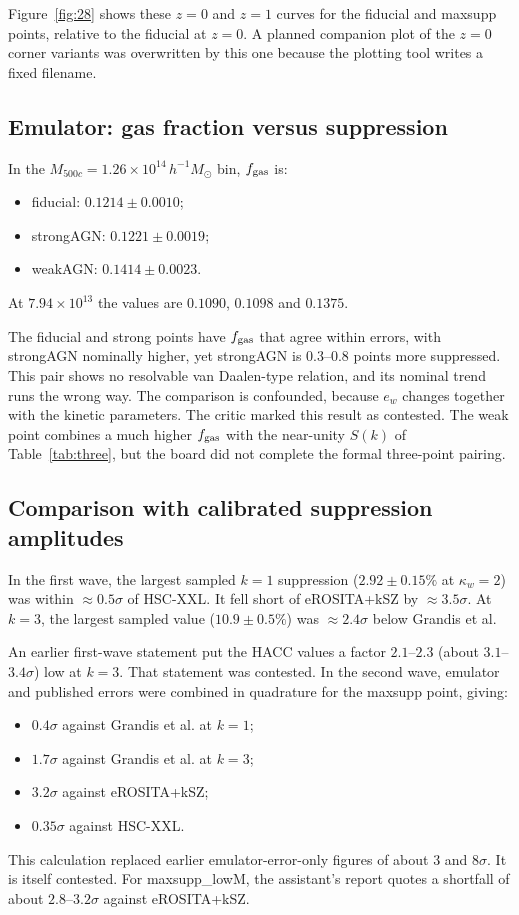 \documentclass[11pt,a4paper]{article}
\begin{document}
Figure~\ref{fig:28} shows these $z=0$ and $z=1$ curves for the fiducial and maxsupp points, relative to the fiducial at $z=0$. A planned companion plot of the $z=0$ corner variants was overwritten by this one because the plotting tool writes a fixed filename.






\subsection{Emulator: gas fraction versus suppression}
In the $M_{500c}=1.26\times10^{14}\,h^{-1}M_\odot$ bin, $f_{\rm gas}$ is:
\begin{itemize}
\item fiducial: $0.1214\pm0.0010$;
\item strongAGN: $0.1221\pm0.0019$;
\item weakAGN: $0.1414\pm0.0023$.
\end{itemize}
At $7.94\times10^{13}$ the values are $0.1090$, $0.1098$ and $0.1375$.

The fiducial and strong points have $f_{\rm gas}$ that agree within errors, with strongAGN nominally higher, yet strongAGN is 0.3--0.8 points more suppressed. This pair shows no resolvable van Daalen-type relation, and its nominal trend runs the wrong way. The comparison is confounded, because $e_w$ changes together with the kinetic parameters. The critic marked this result as contested. The weak point combines a much higher $f_{\rm gas}$ with the near-unity $S(k)$ of Table~\ref{tab:three}, but the board did not complete the formal three-point pairing.

\subsection{Comparison with calibrated suppression amplitudes}
In the first wave, the largest sampled $k=1$ suppression ($2.92\pm0.15\%$ at $\kappa_w=2$) was within $\approx0.5\sigma$ of HSC-XXL. It fell short of eROSITA+kSZ by $\approx3.5\sigma$. At $k=3$, the largest sampled value ($10.9\pm0.5\%$) was $\approx2.4\sigma$ below Grandis et al.

An earlier first-wave statement put the HACC values a factor $2.1$--$2.3$ (about $3.1$--$3.4\sigma$) low at $k=3$. That statement was contested. In the second wave, emulator and published errors were combined in quadrature for the maxsupp point, giving:
\begin{itemize}
\item $0.4\sigma$ against Grandis et al. at $k=1$;
\item $1.7\sigma$ against Grandis et al. at $k=3$;
\item $3.2\sigma$ against eROSITA+kSZ;
\item $0.35\sigma$ against HSC-XXL.
\end{itemize}
This calculation replaced earlier emulator-error-only figures of about 3 and $8\sigma$. It is itself contested. For maxsupp\_lowM, the assistant's report quotes a shortfall of about $2.8$--$3.2\sigma$ against eROSITA+kSZ.
\end{document}

